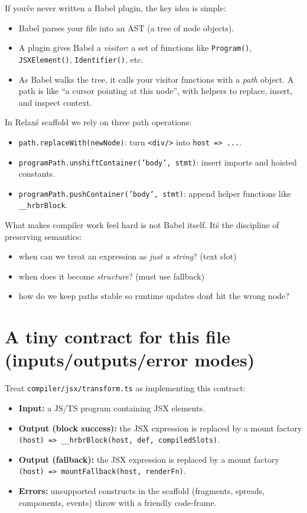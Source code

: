 If you\'ve never written a Babel plugin, the key idea is simple:

\begin{itemize}
\item Babel parses your file into an AST (a tree of node objects).
\item A plugin gives Babel a \emph{visitor}: a set of functions like \texttt{Program()}, \texttt{JSXElement()}, \texttt{Identifier()}, etc.
\item As Babel walks the tree, it calls your visitor functions with a \emph{path} object.
  A path is like ``a cursor pointing at this node'', with helpers to replace, insert, and inspect context.
\end{itemize}

In Relax\'s scaffold we rely on three path operations:

\begin{itemize}
\item \texttt{path.replaceWith(newNode)}: turn \texttt{<div/>} into \texttt{host => ...}.
\item \texttt{programPath.unshiftContainer('body', stmt)}: insert imports and hoisted constants.
\item \texttt{programPath.pushContainer('body', stmt)}: append helper functions like \texttt{\_\_hrbrBlock}.
\end{itemize}

What makes compiler work feel hard is not Babel itself.
It\'s the discipline of preserving semantics:

\begin{itemize}
\item when can we treat an expression as \emph{just a string}? (text slot)
\item when does it become \emph{structure}? (must use fallback)
\item how do we keep paths stable so runtime updates don\'t hit the wrong node?
\end{itemize}

\section{A tiny contract for this file (inputs/outputs/error modes)}

Treat \texttt{compiler/jsx/transform.ts} as implementing this contract:

\begin{itemize}
\item \textbf{Input:} a JS/TS program containing JSX elements.
\item \textbf{Output (block success):} the JSX expression is replaced by a mount factory
  	\texttt{(host) => \_\_hrbrBlock(host, def, compiledSlots)}.
\item \textbf{Output (fallback):} the JSX expression is replaced by a mount factory
  	\texttt{(host) => mountFallback(host, renderFn)}.
\item \textbf{Errors:} unsupported constructs in the scaffold (fragments, spreads, components, events) throw with a friendly code-frame.
\end{itemize}

